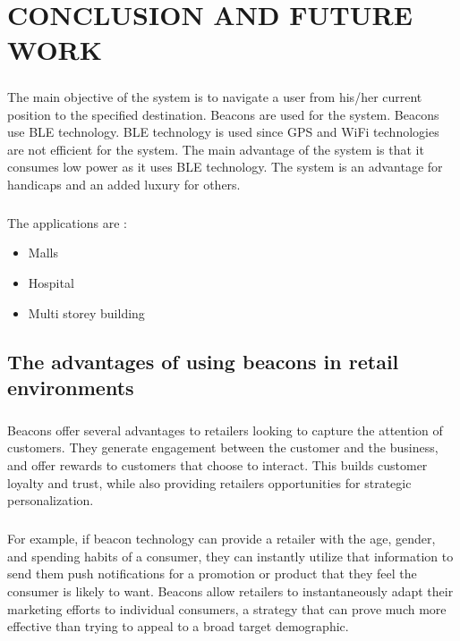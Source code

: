 \documentclass[a4paper,12pt]{report}
\begin{document}
\chapter{CONCLUSION AND FUTURE WORK}
\paragraph{} The main objective of the system is to navigate a user from his/her current position to the specified destination. Beacons are used for the system. Beacons use BLE technology. BLE technology is used since GPS and WiFi technologies are not efficient for the system. The main advantage of the system is that it consumes low power as it uses BLE technology. The system is an advantage for handicaps and an added luxury for others.
\paragraph{} The applications are :
\begin{itemize}
	\item Malls
	\item Hospital
	\item Multi storey building
\end{itemize}
\section{The advantages of using beacons in retail environments}
\paragraph{}Beacons offer several advantages to retailers looking to capture the attention of customers. They generate engagement between the customer and the business, and offer rewards to customers that choose to interact.  This builds customer loyalty and trust, while also providing retailers opportunities for strategic personalization.
\paragraph{}For example, if beacon technology can provide a retailer with the age, gender, and spending habits of a consumer, they can instantly utilize that information to send them push notifications for a promotion or product that they feel the consumer is likely to want. Beacons allow retailers to instantaneously adapt their marketing efforts to individual consumers, a strategy that can prove much more effective than trying to appeal to a broad target demographic.
\end{document}
